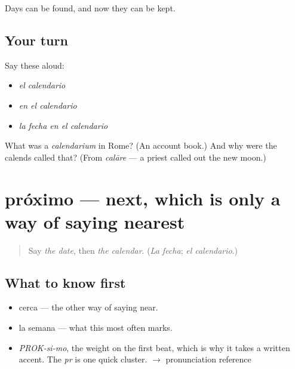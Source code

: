 \begin{grammarlens}[title={What you've built}]
Days can be found, and now they can be kept.
\end{grammarlens}

\subsection*{Your turn}
Say these aloud:

\begin{itemize}
\raggedright
  \item \emph{el calendario}
  \item \emph{en el calendario}
  \item \emph{la fecha en el calendario}
\end{itemize}

\begin{tcolorbox}[breakable,colback=teal!4,colframe=teal!35!black,title={Before you move on}]
What was a \emph{calendarium} in Rome? (An account book.) And why were the calends called that? (From \emph{calāre} — a priest called out the new moon.)
\end{tcolorbox}
\section[próximo]{próximo — next, which is only a way of saying nearest}

\label{lesson:ES-C343-proximo}



\begin{quote}
Say \emph{the date}, then \emph{the calendar}. (\emph{La fecha}; \emph{el calendario}.)
\end{quote}

\subsection*{What to know first}
\begin{itemize}
\raggedright
  \item cerca — the other way of saying near.
  \item la semana — what this most often marks.
\end{itemize}

\begin{sounds}
\begin{itemize}
\raggedright
  \item \emph{PROK-si-mo}, the weight on the first beat, which is why it takes a written accent. The \emph{pr} is one quick cluster. $\to$ pronunciation reference
\end{itemize}
\end{sounds}

